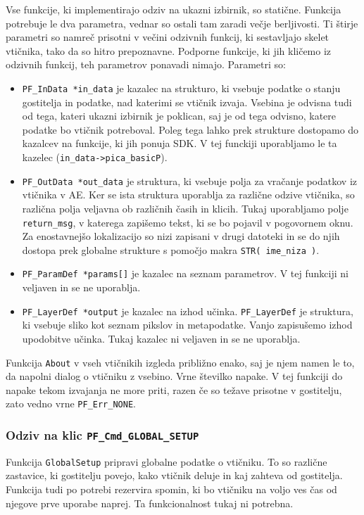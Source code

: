 \documentclass[a4paper, 12pt]{book}
\begin{document}
Vse funkcije, ki implementirajo odziv na ukazni izbirnik, so statične.
Funkcija potrebuje le dva parametra, vednar so ostali tam zaradi večje berljivosti\cite{aesdk}.	
Ti štirje parametri so namreč prisotni v večini odzivnih funkcij, ki sestavljajo skelet vtičnika, tako da so hitro prepoznavne. %
Podporne funkcije, ki jih kličemo iz odzivnih funkcij, teh parametrov ponavadi nimajo.
Parametri so:
\begin{itemize}
\item{\texttt{PF\_InData *in\_data} je kazalec na strukturo, ki vsebuje podatke o stanju gostitelja in podatke, nad katerimi se vtičnik izvaja. 
	Vsebina je odvisna tudi od tega, kateri ukazni izbirnik je poklican, saj je od tega odvisno, katere podatke bo vtičnik potreboval. 
	Poleg tega lahko prek strukture dostopamo do kazalcev na funkcije, ki jih ponuja SDK. 
	V tej funckiji uporabljamo le ta kazelec (\texttt{in\_data->pica\_basicP}). }
\item{\texttt{PF\_OutData *out\_data} je struktura, ki vsebuje polja za vračanje podatkov iz vtičnika v AE. 
	Ker se ista struktura uporablja za različne odzive vtičnika, so različna polja veljavna ob različnih časih in klicih. 
	Tukaj uporabljamo polje \texttt{return\_msg}, v katerega zapišemo tekst, ki se bo pojavil v pogovornem oknu. 
	Za enostavnejšo lokalizacijo so nizi zapisani v drugi datoteki in se do njih dostopa prek globalne strukture s pomočjo makra \texttt{STR( ime\_niza )}.  }
\item{\texttt{PF\_ParamDef *params[]} je kazalec na seznam parametrov. V tej funkciji ni veljaven in se ne uporablja.  }
\item{\texttt{PF\_LayerDef *output} je kazalec na izhod učinka. 
	\texttt{PF\_LayerDef} je struktura, ki vsebuje sliko kot seznam pikslov in metapodatke. 
	Vanjo zapisušemo izhod upodobitve učinka. Tukaj kazalec ni veljaven in se ne uporablja.  }
\end{itemize}

Funkcija \texttt{About} v vseh vtičnikih izgleda približno enako, saj je njem namen le to, da napolni dialog o vtičniku z vsebino.
Vrne številko napake.
V tej funkciji do napake tekom izvajanja ne more priti, razen če so težave prisotne v gostitelju, zato vedno vrne \texttt{PF\_Err\_NONE}.


\subsubsection{Odziv na klic \texttt{PF\_Cmd\_GLOBAL\_SETUP}}
Funkcija \texttt{GlobalSetup} pripravi globalne podatke o vtičniku. 
To so različne zastavice, ki gostitelju povejo, kako vtičnik deluje in kaj zahteva od gostitelja.
Funkcija tudi po potrebi rezervira spomin, ki bo vtičniku na voljo ves čas od njegove prve uporabe naprej.
Ta funkcionalnost tukaj ni potrebna.
\end{document}
